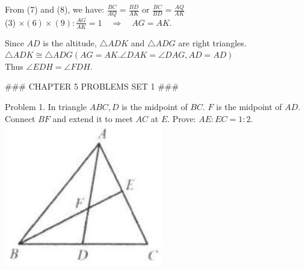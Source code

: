\documentclass[10pt]{article}
\begin{document}
From (7) and (8), we have: \(\frac{B C}{A Q}=\frac{B D}{A K}\) or \(\frac{B C}{B D}=\frac{A Q}{A K}\)\\
(3) \(\times(6) \times(9): \frac{A G}{A K}=1 \quad \Rightarrow \quad A G=A K\).

Since \(A D\) is the altitude, \(\triangle A D K\) and \(\triangle A D G\) are right triangles.\\
\(\triangle A D K \cong \triangle A D G(A G=A K . \angle D A K=\angle D A G, A D=A D)\)\\
Thus \(\angle E D H=\angle F D H\).


### CHAPTER 5 PROBLEMS SET 1 ###

Problem 1. In triangle \(A B C, D\) is the midpoint of \(B C\). \(F\) is the midpoint of \(A D\). Connect \(B F\) and extend it to meet \(A C\) at \(E\). Prove: \(A E: E C=1: 2\).\\
\includegraphics[max width=\textwidth, center]{2025_04_17_97bc1f7e44d93c271a88g-126(3)}
\end{document}
